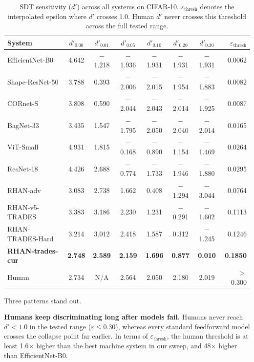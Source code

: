 \documentclass[12pt,a4paper]{article}
\begin{document}
\begin{table}[H]
\centering
\caption{SDT sensitivity ($d'$) across all systems on CIFAR-10.
$\varepsilon_{\text{thresh}}$ denotes the interpolated epsilon where
$d'$ crosses 1.0. Human $d'$ never crosses this threshold across
the full tested range.}
\label{tab:sdt}
\renewcommand{\arraystretch}{1.3}
\begin{tabularx}{\textwidth}{lCCCCCCr}
\toprule
\textbf{System} &
\boldmath$d'_{0.00}$ & \boldmath$d'_{0.01}$ & \boldmath$d'_{0.05}$ &
\boldmath$d'_{0.10}$ & \boldmath$d'_{0.20}$ & \boldmath$d'_{0.30}$ &
\boldmath$\varepsilon_{\text{thresh}}$ \\
\midrule
EfficientNet-B0  & 4.642 & $-$1.218 & $-$1.936 & $-$1.931 & $-$1.931 & $-$1.931 & 0.0062 \\
Shape-ResNet-50  & 3.788 &    0.393 & $-$2.006 & $-$2.015 & $-$1.954 & $-$1.883 & 0.0082 \\
CORnet-S         & 3.808 &    0.590 & $-$2.044 & $-$2.043 & $-$2.014 & $-$1.925 & 0.0087 \\
BagNet-33        & 3.435 &    1.547 & $-$1.795 & $-$2.050 & $-$2.040 & $-$2.014 & 0.0165 \\
ViT-Small        & 4.931 &    1.815 & $-$0.168 & $-$0.890 & $-$1.154 & $-$1.469 & 0.0264 \\
ResNet-18        & 4.426 &    2.688 & $-$0.774 & $-$1.733 & $-$1.946 & $-$1.880 & 0.0295 \\
\midrule
RHAN-adv         & 3.083 & 2.738 & 1.662 & 0.408 & $-$1.294 & $-$3.044 & 0.0764 \\
RHAN-v5-TRADES   & 3.383 & 3.186 & 2.230 & 1.231 & $-$0.291 & $-$1.602 & 0.1113 \\
RHAN-TRADES-Hard & 3.214 & 3.012 & 2.418 & 1.587 & 0.312  & $-$1.245 & 0.1246 \\
\textbf{RHAN-trades-cur} & \textbf{2.748} & \textbf{2.589} & \textbf{2.159} &
                    \textbf{1.696} & \textbf{0.877} & \textbf{0.010} & \textbf{0.1850} \\
\midrule
Human            & 2.734 & N/A   & 2.564 & 2.050 & 2.180 & 2.019 & $>$0.300 \\
\bottomrule
\end{tabularx}
\end{table}

Three patterns stand out.

\textbf{Humans keep discriminating long after models fail.} Humans never reach
$d'{<}1.0$ in the tested range ($\varepsilon \le 0.30$), whereas every standard
feedforward model crosses the collapse point far earlier. In terms of
$\varepsilon_{\text{thresh}}$, the human threshold is at least 1.6$\times$ higher
than the best machine system in our sweep, and 48$\times$ higher than
EfficientNet-B0.
\end{document}
